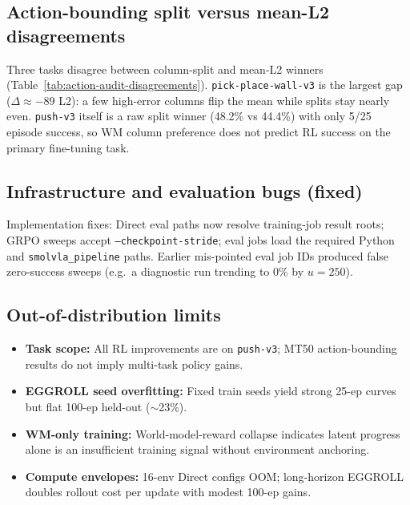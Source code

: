 \subsection{Action-bounding split versus mean-L2 disagreements}
Three tasks disagree between column-split and mean-L2 winners (Table~\ref{tab:action-audit-disagreements}). \texttt{pick-place-wall-v3} is the largest gap ($\Delta \approx -89$ L2): a few high-error columns flip the mean while splits stay nearly even. \texttt{push-v3} itself is a raw split winner (48.2\% vs 44.4\%) with only 5/25 episode success, so WM column preference does not predict RL success on the primary fine-tuning task.

\subsection{Infrastructure and evaluation bugs (fixed)}
Implementation fixes: Direct eval paths now resolve training-job result roots; GRPO sweeps accept \texttt{--checkpoint-stride}; eval jobs load the required Python and \texttt{smolvla\_pipeline} paths. Earlier mis-pointed eval job IDs produced false zero-success sweeps (e.g.\ a diagnostic run trending to 0\% by $u{=}250$).

\subsection{Out-of-distribution limits}
\begin{itemize}
  \item \textbf{Task scope:} All RL improvements are on \texttt{push-v3}; MT50 action-bounding results do not imply multi-task policy gains.
  \item \textbf{EGGROLL seed overfitting:} Fixed train seeds yield strong 25-ep curves but flat 100-ep held-out ($\sim$23\%).
  \item \textbf{WM-only training:} World-model-reward collapse indicates latent progress alone is an insufficient training signal without environment anchoring.
  \item \textbf{Compute envelopes:} 16-env Direct configs OOM; long-horizon EGGROLL doubles rollout cost per update with modest 100-ep gains.
\end{itemize}